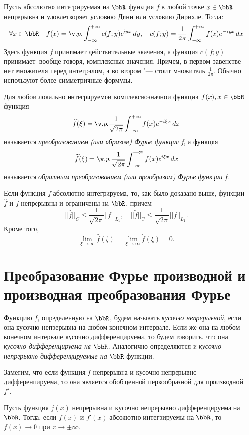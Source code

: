 Пусть абсолютно интегрируемая на $\bbR$ функция $f$ в любой точке $x \in \bbR$ непрерывна и удовлетворяет условию Дини или условию Дирихле. Тогда:
$$
\forall x \in \bbR\quad f(x) = \v.p.\int_{-\infty}^{+\infty} c(f;y)e^{iyx}\,dy,\quad c(f;y)=\frac{1}{2\pi}\int_{-\infty}^{+\infty} f(x)e^{-iyx}\,dx
$$
Здесь функция $f$ принимает действительные значения, а функция $c(f;y)$ принимает, вообще говоря, комплексные значения. Причем, в первом равенстве нет множителя перед интегралом, а во втором "--- стоит множитель $\frac{1}{2\pi}$. Обычно используют более симметричные формулы.
\begin{defn}
Для любой локально интегрируемой комплекснозначной функции $f(x), x \in \bbR$ функция
$$
\widehat{f}(\xi) = \v.p.\frac{1}{\sqrt{2\pi}} \int_{-\infty}^{+\infty} f(x)e^{-i\xi x}\,dx
$$
называется \textit{преобразованием (или образом) Фурье функции f}, а функция
$$
\widetilde{f}(\xi) = \v.p.\frac{1}{\sqrt{2\pi}} \int_{-\infty}^{+\infty} f(x)e^{i\xi x}\,dx
$$
называется \textit{обратным преобразованием (или прообразом) Фурье функции f}.
\end{defn}
Если функция $f$ абсолютно интегрируема, то, как было доказано выше, функции $\widehat{f}$ и $\widetilde{f}$ непрерывны и ограничены на $\bbR$, причем
$$
||\widehat{f}||_C \le \frac{1}{\sqrt{2\pi}}||f||_{L_1}, \quad ||\widetilde{f}||_C \le \frac{1}{\sqrt{2\pi}}||f||_{L_1}.
$$
Кроме того,
$$
\lim_{\xi \to \infty} \widehat{f}(\xi) = \lim_{\xi \to \infty} \widetilde{f}(\xi) = 0.
$$

\section{Преобразование Фурье производной и производная преобразования Фурье}

Функцию $f$, определенную на $\bbR$, будем называть \textit{кусочно непрерывной}, если она кусочно непрерывна на любом конечном интервале. Если же она на любом конечном интервале кусочно дифференцируема, то будем говорить, что она \textit{кусочно дифференцируема на $\bbR$}. Аналогично определяются и \textit{кусочно непрерывно дифференцируемые на $\bbR$} функции. 

Заметим, что если функция $f$ непрерывна и кусочно непрерывно дифференцируема, то она является обобщенной первообразной для производной $f'$.

\begin{lemm}
Пусть функция $f(x)$ непрерывна и кусочно непрерывно дифференцируема на $\bbR$. Тогда, если $f(x)$ и $f'(x)$ абсолютно интегрируемы на $\bbR$, то $f(x)\to 0$ при $x\to\pm\infty$.
\end{lemm}


